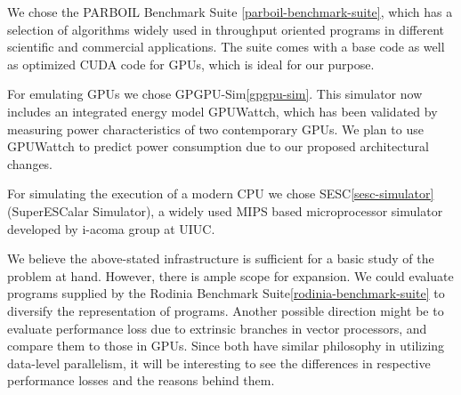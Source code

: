 \par{
We chose the PARBOIL Benchmark Suite \ref{parboil-benchmark-suite}, which has a selection of algorithms widely used in throughput oriented programs in different scientific and commercial applications. The suite comes with a base code as well as optimized CUDA code for GPUs, which is ideal for our purpose.
}

\par{
For emulating GPUs we chose GPGPU-Sim\ref{gpgpu-sim}. This simulator now includes an integrated energy model GPUWattch, which has been validated by measuring power characteristics of two contemporary GPUs. We plan to use GPUWattch to predict power consumption due to our proposed architectural changes.
}

\par{
For simulating the execution of a modern CPU we chose SESC\ref{sesc-simulator} (SuperESCalar Simulator), a widely used MIPS based microprocessor simulator developed by i-acoma group at UIUC.
}

\par{We believe the above-stated infrastructure is sufficient for a basic study of the problem at hand. However, there is ample scope for expansion. We could evaluate programs supplied by the Rodinia Benchmark Suite\ref{rodinia-benchmark-suite} to diversify the representation of programs. Another possible direction might be to evaluate performance loss due to extrinsic branches in vector processors, and compare them to those in GPUs. Since both have similar philosophy in utilizing data-level parallelism, it will be interesting to see the differences in respective performance losses and the reasons behind them.}
